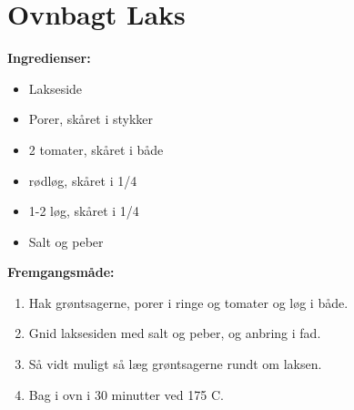 \documentclass{book}
\begin{document}
\newpage \section{Ovnbagt Laks}
\begin{minipage}[t] {0.5\textwidth}
\textbf{Ingredienser:}
    \begin{itemize}
        \item Lakseside
        \item Porer, skåret i stykker
        \item 2 tomater, skåret i både
        \item rødløg, skåret i 1/4
        \item 1-2 løg, skåret i 1/4
        \item Salt og peber
    \end{itemize}
\end{minipage}
\begin{minipage}[t] {0.5\textwidth}
\textbf{Fremgangsmåde:}
\begin{enumerate}
    \item Hak grøntsagerne, porer i ringe og tomater og løg i både.
    \item Gnid laksesiden med salt og peber, og anbring i fad.
    \item Så vidt muligt så læg grøntsagerne rundt om laksen.
    \item Bag i ovn i 30 minutter ved 175 \degree C.
\end{enumerate}
\end{minipage}
\newpage 
\end{document}
